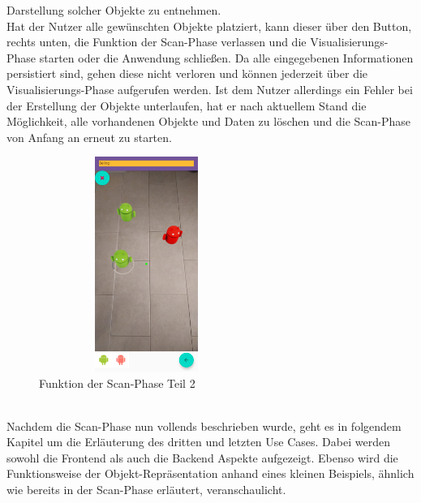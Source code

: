 Darstellung solcher Objekte zu entnehmen. 
\\ 
\linebreak
Hat der Nutzer alle gewünschten Objekte platziert, kann dieser über den Button, rechts unten, die Funktion der Scan-Phase verlassen und die 
Visualisierungs-Phase starten oder die Anwendung schließen. Da alle eingegebenen Informationen persistiert sind, gehen diese nicht verloren und können jederzeit 
über die Visualisierungs-Phase aufgerufen werden. Ist dem Nutzer allerdings ein Fehler bei der Erstellung der Objekte unterlaufen, hat er nach aktuellem Stand 
die Möglichkeit, alle vorhandenen Objekte und Daten zu löschen und die Scan-Phase von Anfang an erneut zu starten.  
\begin{figure}[hbt!]
    \centering
    \includegraphics[width=7cm,height=7cm,keepaspectratio]{4Umsetzung/Bilder/place_objects_view.jpg}
    \caption{Funktion der Scan-Phase Teil 2}
    \label{pic:place_objects}
\end{figure}
\\ 
Nachdem die Scan-Phase nun vollends beschrieben wurde, geht es in folgendem Kapitel um die Erläuterung des dritten und letzten Use Cases. Dabei werden sowohl 
die Frontend als auch die Backend Aspekte aufgezeigt. Ebenso wird die Funktionsweise der Objekt-Repräsentation anhand eines kleinen Beispiels, ähnlich wie bereits in 
der Scan-Phase erläutert, veranschaulicht.
